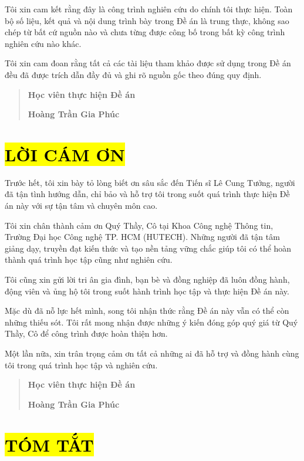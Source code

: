 \documentclass[
]{article}
\begin{document}
Tôi xin cam kết rằng đây là công trình nghiên cứu do chính tôi thực
hiện. Toàn bộ số liệu, kết quả và nội dung trình bày trong Đề án là
trung thực, không sao chép từ bất cứ nguồn nào và chưa từng được công bố
trong bất kỳ công trình nghiên cứu nào khác.

Tôi xin cam đoan rằng tất cả các tài liệu tham khảo được sử dụng trong
Đề án đều đã được trích dẫn đầy đủ và ghi rõ nguồn gốc theo đúng quy
định.

\begin{quote}
\textbf{Học viên thực hiện Đề án}

\textbf{Hoàng Trần Gia Phúc}
\end{quote}

\section{\texorpdfstring{\hl{LỜI CÁM
ƠN}}{LỜI CÁM ƠN}}\label{lux1eddi-cuxe1m-ux1a1n}

Trước hết, tôi xin bày tỏ lòng biết ơn sâu sắc đến Tiến sĩ Lê Cung
Tưởng, người đã tận tình hướng dẫn, chỉ bảo và hỗ trợ tôi trong suốt quá
trình thực hiện Đề án này với sự tận tâm và chuyên môn cao.

Tôi xin chân thành cảm ơn Quý Thầy, Cô tại Khoa Công nghệ Thông tin,
Trường Đại học Công nghệ TP. HCM (HUTECH). Những người đã tận tâm giảng
dạy, truyền đạt kiến thức và tạo nền tảng vững chắc giúp tôi có thể hoàn
thành quá trình học tập cũng như nghiên cứu.

Tôi cũng xin gửi lời tri ân gia đình, bạn bè và đồng nghiệp đã luôn đồng
hành, động viên và ủng hộ tôi trong suốt hành trình học tập và thực hiện
Đề án này.

Mặc dù đã nỗ lực hết mình, song tôi nhận thức rằng Đề án này vẫn có thể
còn những thiếu sót. Tôi rất mong nhận được những ý kiến đóng góp quý
giá từ Quý Thầy, Cô để công trình được hoàn thiện hơn.

Một lần nữa, xin trân trọng cảm ơn tất cả những ai đã hỗ trợ và đồng
hành cùng tôi trong quá trình học tập và nghiên cứu.

\begin{quote}
\textbf{Học viên thực hiện Đề án}

\textbf{Hoàng Trần Gia Phúc}
\end{quote}

\section{\texorpdfstring{\hl{TÓM TẮT}}{TÓM TẮT}}\label{tuxf3m-tux1eaft}
\end{document}
